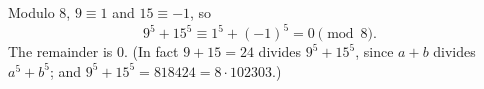 Modulo $8$, $9\equiv1$ and $15\equiv-1$, so
\[
9^5+15^5\equiv1^5+(-1)^5=0\pmod8 .
\]
The remainder is $\boxed{0}$. (In fact $9+15=24$ divides $9^5+15^5$, since $a+b$ divides $a^5+b^5$; and $9^5+15^5=818424=8\cdot102303$.)
